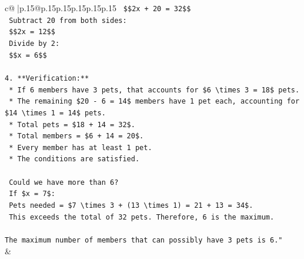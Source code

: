 \documentclass{article}
\begin{document}
{\begin{supertabular}{c@{$\;$}|p{.15\linewidth}@{}p{.15\linewidth}p{.15\linewidth}p{.15\linewidth}p{.15\linewidth}p{.15\linewidth}}
{{{\texttt{    \$\$2x + 20 = 32\$\$} \\
\texttt{    Subtract 20 from both sides:} \\
\texttt{    \$\$2x = 12\$\$} \\
\texttt{    Divide by 2:} \\
\texttt{    \$\$x = 6\$\$} \\
\\ 
\texttt{4.  **Verification:**} \\
\texttt{    *   If 6 members have 3 pets, that accounts for \$6 \textbackslash{}times 3 = 18\$ pets.} \\
\texttt{    *   The remaining \$20 {-} 6 = 14\$ members have 1 pet each, accounting for \$14 \textbackslash{}times 1 = 14\$ pets.} \\
\texttt{    *   Total pets = \$18 + 14 = 32\$.} \\
\texttt{    *   Total members = \$6 + 14 = 20\$.} \\
\texttt{    *   Every member has at least 1 pet.} \\
\texttt{    *   The conditions are satisfied.} \\
\\ 
\texttt{    Could we have more than 6?} \\
\texttt{    If \$x = 7\$:} \\
\texttt{    Pets needed = \$7 \textbackslash{}times 3 + (13 \textbackslash{}times 1) = 21 + 13 = 34\$.} \\
\texttt{    This exceeds the total of 32 pets. Therefore, 6 is the maximum.} \\
\\ 
\texttt{The maximum number of members that can possibly have 3 pets is 6."} \\
            }
        }
    }
    & \\ \\


\end{supertabular}}
\end{document}
